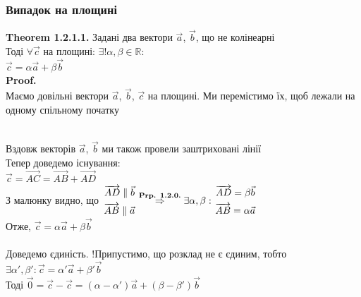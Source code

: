 \documentclass[a4paper, 14pt]{extarticle}
\def\th#1{\textbf{Theorem {#1}}}
\def\proof{\textbf{Proof.}\\}
\begin{document}
	\subsubsection{Випадок на площині}
	\th{1.2.1.1.} Задані два вектори $\vec{a}$, $\vec{b}$, що не колінеарні\\
	Тоді $\forall \vec{c}$ на площині: $\exists! \alpha, \beta \in \mathbb{R}:$\\
	$\vec{c} = \alpha \vec{a} + \beta \vec{b}$\\
	\proof
	Маємо довільні вектори $\vec{a}$, $\vec{b}$, $\vec{c}$ на площині. Ми перемістимо їх, щоб лежали на одному спільному початку\\
	\\
	Вздовж векторів $\vec{a}$, $\vec{b}$ ми також провели заштриховані лінії\\
	Тепер доведемо існування:\\
	$\vec{c} = \overrightarrow{AC} = \overrightarrow{AB} + \overrightarrow{AD}$\\
	З малюнку видно, що $\left. \begin{gathered} \overrightarrow{AD} \parallel \vec{b} \\ \overrightarrow{AB} \parallel \vec{a} \end{gathered} \right. \overset{\textrm{\textbf{Prp. 1.2.0.}}}{\Rightarrow} \exists \alpha, \beta: \left. \begin{gathered} \overrightarrow{AD} = \beta \vec{b} \\ \overrightarrow{AB} = \alpha \vec{a} \end{gathered} \right.$\\
	Отже, $\vec{c} = \alpha \vec{a} + \beta \vec{b}$\\
	\\
	Доведемо єдиність. !Припустимо, що розклад не є єдиним, тобто \\ $\exists \alpha', \beta': \vec{c} = \alpha' \vec{a} + \beta' \vec{b}$\\
	Тоді $\vec{0} = \vec{c} - \vec{c} = (\alpha-\alpha') \vec{a} + (\beta - \beta') \vec{b}$\\
\end{document}
